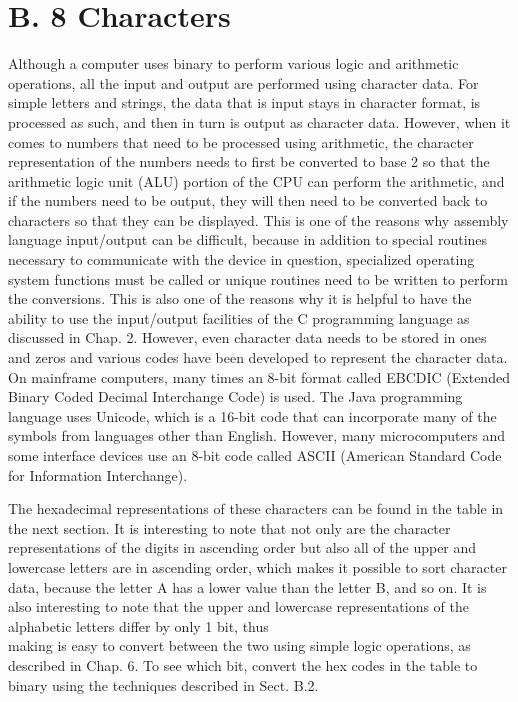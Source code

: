 \documentclass[10pt]{book}
\begin{document}
\section{B. 8 Characters}
Although a computer uses binary to perform various logic and arithmetic operations, all the input and output are performed using character data. For simple letters and strings, the data that is input stays in character format, is processed as such, and then in turn is output as character data. However, when it comes to numbers that need to be processed using arithmetic, the character representation of the numbers needs to first be converted to base 2 so that the arithmetic logic unit (ALU) portion of the CPU can perform the arithmetic, and if the numbers need to be output, they will then need to be converted back to characters so that they can be displayed. This is one of the reasons why assembly language input/output can be difficult, because in addition to special routines necessary to communicate with the device in question, specialized operating system functions must be called or unique routines need to be written to perform the conversions. This is also one of the reasons why it is helpful to have the ability to use the input/output facilities of the C programming language as discussed in Chap. 2. However, even character data needs to be stored in ones and zeros and various codes have been developed to represent the character data. On mainframe computers, many times an 8-bit format called EBCDIC (Extended Binary Coded Decimal Interchange Code) is used. The Java programming language uses Unicode, which is a 16-bit code that can incorporate many of the symbols from languages other than English. However, many microcomputers and some interface devices use an 8-bit code called ASCII (American Standard Code for Information Interchange).

The hexadecimal representations of these characters can be found in the table in the next section. It is interesting to note that not only are the character representations of the digits in ascending order but also all of the upper and lowercase letters are in ascending order, which makes it possible to sort character data, because the letter A has a lower value than the letter B, and so on. It is also interesting to note that the upper and lowercase representations of the alphabetic letters differ by only 1 bit, thus\\
making is easy to convert between the two using simple logic operations, as described in Chap. 6. To see which bit, convert the hex codes in the table to binary using the techniques described in Sect. B.2.
\end{document}
